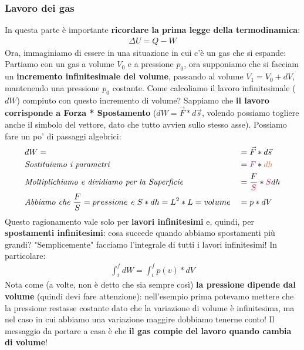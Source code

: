             \subsubsection{Lavoro dei gas}
                In questa parte è importante \textbf{ricordare la prima legge della termodinamica}:
                \begin{align*}
                    \Delta U = Q-W
                \end{align*}
                Ora, immaginiamo di essere in una situazione in cui c'è un gas che si espande:
                Partiamo con un gas a volume $V_0$ e a pressione $p_0$, ora supponiamo che si facciam un \textbf{incremento infinitesimale del volume}, passando al volume $V_1=V_0+dV$, mantenendo una pressione $p_0$ costante. Come calcoliamo il lavoro infinitesimale ($dW$) compiuto con questo incremento di volume? Sappiamo che \textbf{il lavoro corrisponde a Forza * Spostamento} ($dW = \vec{F}*d\vec{s}$, volendo possiamo togliere anche il simbolo del vettore, dato che tutto avvien sullo stesso asse). Possiamo fare un po' di passaggi algebrici:
                \begin{align*}
                    &dW= &&= \vec{F}*d\vec{s}\\
                    &\textrm{\textit{Sostituiamo i parametri}}&& =\textcolor{Purple}{F}*\textcolor{Orange}{dh}\\
                    &\textrm{\textit{Moltiplichiamo e dividiamo per la Superficie}}&& = \frac{F}{\textcolor{OrangeRed}{S}}*\textcolor{OrangeRed}{S}dh\\
                    &\textrm{\textit{Abbiamo che $\frac{F}{S}=pressione$ e $S*dh=L^2*L=volume$}} &&=p*dV
                \end{align*}
                Questo ragionamento vale solo per \textbf{lavori infinitesimi} e, quindi, per \textbf{spostamenti infinitesimi}: cosa succede quando abbiamo spostamenti più grandi? "Semplicemente" facciamo l'integrale di tutti i lavori infinitesimi! In particolare:
                \begin{align*}
                    \int_i^f dW = \int_i^f p(v)*dV
                \end{align*}
                Nota come (a volte, non è detto che sia sempre così) \textbf{la pressione dipende dal volume} (quindi devi fare attenzione): nell'esempio prima potevamo mettere che la pressione restasse costante dato che la variazione di volume è infinitesima, ma nel caso in cui abbiamo una variazione maggire dobbiamo tenerne conto! Il messaggio da portare a casa è che \textbf{il gas compie del lavoro quando cambia di volume}!


